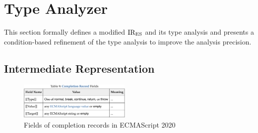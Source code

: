\section{Type Analyzer}\label{sec:analyzer}

This section formally defines a modified ${\text{IR}_\text{ES}}$ and its type analysis
and presents a condition-based refinement of the type analysis to improve the analysis precision. 

\subsection{Intermediate Representation}\label{sec:ires}

\begin{figure}
  \centering
  \includegraphics[width=0.48\textwidth]{img/record-fields-table}
  \caption{Fields of completion records in ECMAScript 2020}
  \label{fig:record-fields-table}
  \vspace*{-1.5em}
\end{figure}

